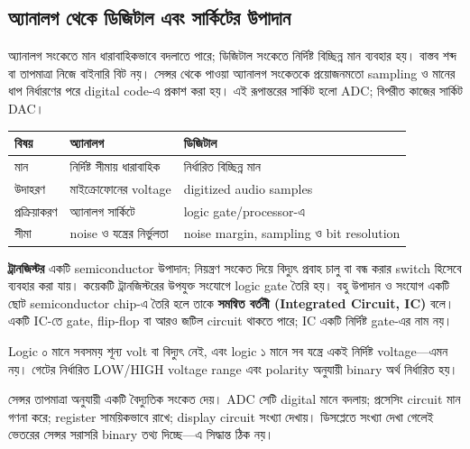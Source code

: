 \subsection{অ্যানালগ থেকে ডিজিটাল এবং সার্কিটের উপাদান}
অ্যানালগ সংকেতে মান ধারাবাহিকভাবে বদলাতে পারে; ডিজিটাল সংকেতে নির্দিষ্ট বিচ্ছিন্ন মান ব্যবহার হয়। বাস্তব শব্দ বা তাপমাত্রা নিজে বাইনারি বিট নয়। সেন্সর থেকে পাওয়া অ্যানালগ সংকেতকে প্রয়োজনমতো sampling ও মানের ধাপ নির্ধারণের পরে digital code-এ প্রকাশ করা হয়। এই রূপান্তরের সার্কিট হলো ADC; বিপরীত কাজের সার্কিট DAC।

\begin{center}\begin{tabularx}{\linewidth}{|L{.2\linewidth}|Y|Y|}\hline
বিষয় & অ্যানালগ & ডিজিটাল\\\hline
মান & নির্দিষ্ট সীমায় ধারাবাহিক & নির্ধারিত বিচ্ছিন্ন মান\\\hline
উদাহরণ & মাইক্রোফোনের voltage & digitized audio samples\\\hline
প্রক্রিয়াকরণ & অ্যানালগ সার্কিটে & logic gate/processor-এ\\\hline
সীমা & noise ও যন্ত্রের নির্ভুলতা & noise margin, sampling ও bit resolution\\\hline
\end{tabularx}\end{center}

\textbf{ট্রানজিস্টর} একটি semiconductor উপাদান; নিয়ন্ত্রণ সংকেত দিয়ে বিদ্যুৎ প্রবাহ চালু বা বন্ধ করার switch হিসেবে ব্যবহার করা যায়। কয়েকটি ট্রানজিস্টরের উপযুক্ত সংযোগে logic gate তৈরি হয়। বহু উপাদান ও সংযোগ একটি ছোট semiconductor chip-এ তৈরি হলে তাকে \textbf{সমন্বিত বর্তনী (Integrated Circuit, IC)} বলে। একটি IC-তে gate, flip-flop বা আরও জটিল circuit থাকতে পারে; IC একটি নির্দিষ্ট gate-এর নাম নয়।

Logic ০ মানে সবসময় শূন্য volt বা বিদ্যুৎ নেই, এবং logic ১ মানে সব যন্ত্রে একই নির্দিষ্ট voltage—এমন নয়। গেটের নির্ধারিত LOW/HIGH voltage range এবং polarity অনুযায়ী binary অর্থ নির্ধারিত হয়।

\chThreeAnswer সেন্সর তাপমাত্রা অনুযায়ী একটি বৈদ্যুতিক সংকেত দেয়। ADC সেটি digital মানে বদলায়; প্রসেসিং circuit মান গণনা করে; register সাময়িকভাবে রাখে; display circuit সংখ্যা দেখায়। ডিসপ্লেতে সংখ্যা দেখা গেলেই ভেতরের সেন্সর সরাসরি binary তথ্য দিচ্ছে—এ সিদ্ধান্ত ঠিক নয়।
